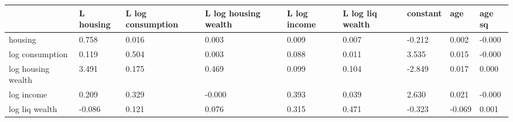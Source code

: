 \begin{table}[htbp]
\begin{tabular}{lllllllll} \hline \hline
 & L housing  & L log consumption  & L log housing wealth  & L log income  & L log liq wealth  & constant  & age  & age sq  \\  \hline 
housing &     0.758 &     0.016 &     0.003 &     0.009 &     0.007 &    -0.212 &     0.002 &    -0.000 \\  
log consumption &     0.119 &     0.504 &     0.003 &     0.088 &     0.011 &     3.535 &     0.015 &    -0.000 \\  
log housing wealth &     3.491 &     0.175 &     0.469 &     0.099 &     0.104 &    -2.849 &     0.017 &     0.000 \\  
log income &     0.209 &     0.329 &    -0.000 &     0.393 &     0.039 &     2.630 &     0.021 &    -0.000 \\  
log liq wealth &    -0.086 &     0.121 &     0.076 &     0.315 &     0.471 &    -0.323 &    -0.069 &     0.001 \\  
\hline \hline \end{tabular}
\end{table}
